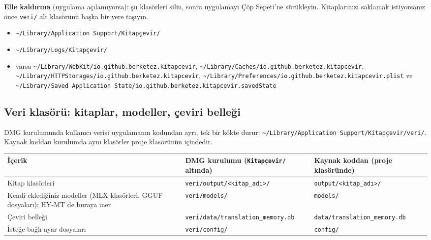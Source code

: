 \documentclass[11pt,a4paper]{article}
\newcommand{\dosya}[1]{\texttt{#1}}
\begin{document}
\textbf{Elle kaldırma} (uygulama açılamıyorsa): şu klasörleri silin, sonra
uygulamayı Çöp Sepeti'ne sürükleyin. Kitaplarınızı saklamak istiyorsanız önce
\dosya{veri/} alt klasörünü başka bir yere taşıyın.
\begin{itemize}
  \item \dosya{\textasciitilde/Library/\allowbreak Application Support/\allowbreak Kitapçevir/}
  \item \dosya{\textasciitilde/Library/\allowbreak Logs/\allowbreak Kitapçevir/}
  \item varsa
        \dosya{\textasciitilde/Library/\allowbreak WebKit/\allowbreak io.github.\allowbreak berketez.\allowbreak kitapcevir},
        \dosya{\textasciitilde/Library/\allowbreak Caches/\allowbreak io.github.\allowbreak berketez.\allowbreak kitapcevir},
        \dosya{\textasciitilde/Library/\allowbreak HTTPStorages/\allowbreak io.github.\allowbreak berketez.\allowbreak kitapcevir},
        \dosya{\textasciitilde/Library/\allowbreak Preferences/\allowbreak io.github.\allowbreak berketez.\allowbreak kitapcevir.plist} ve
        \dosya{\textasciitilde/Library/\allowbreak Saved Application State/\allowbreak io.github.\allowbreak berketez.\allowbreak kitapcevir.savedState}
\end{itemize}

\subsection{Veri klasörü: kitaplar, modeller, çeviri belleği}\label{sec:veri}
DMG kurulumunda kullanıcı verisi uygulamanın kodundan ayrı, tek bir kökte
durur:
\dosya{\textasciitilde/Library/\allowbreak Application Support/\allowbreak Kitapçevir/\allowbreak veri/}.
Kaynak koddan kurulumda aynı klasörler proje klasörünün içindedir.

\vspace{4pt}
\renewcommand{\arraystretch}{1.3}
\noindent\begin{tabular}{@{}L{5.6cm}L{4.6cm}L{4.8cm}@{}}
\toprule
\textbf{İçerik} & \textbf{DMG kurulumu} (\dosya{Kitapçevir/} altında) & \textbf{Kaynak koddan} (proje klasöründe) \\
\midrule
Kitap klasörleri & \dosya{veri/output/\allowbreak<kitap\_adı>/} & \dosya{output/\allowbreak<kitap\_adı>/} \\
Kendi eklediğiniz modeller (MLX klasörleri, GGUF dosyaları); HY-MT de buraya iner & \dosya{veri/models/} & \dosya{models/} \\
Çeviri belleği & \dosya{veri/data/\allowbreak translation\_memory.db} & \dosya{data/\allowbreak translation\_memory.db} \\
İsteğe bağlı ayar dosyaları & \dosya{veri/config/} & \dosya{config/} \\
\bottomrule
\end{tabular}
\vspace{6pt}
\end{document}
